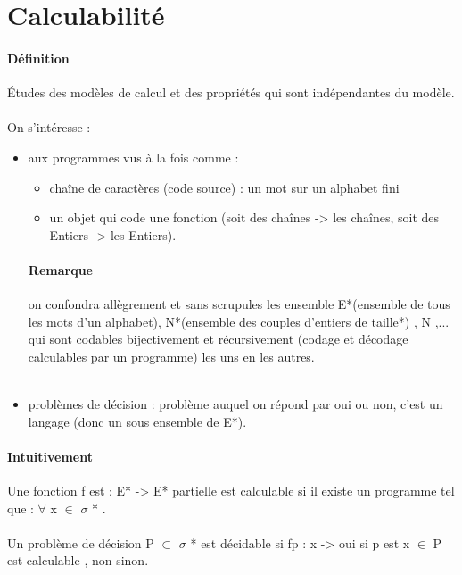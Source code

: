 \documentclass{article}
\begin{document}
\section{Calculabilité}
\paragraph{Définition} Études des modèles de calcul et des propriétés qui sont indépendantes du modèle.\\\\On s'intéresse : 
\begin{itemize}
\item aux programmes vus à la fois comme : 
\begin{itemize}
\item chaîne de caractères (code source) : un mot sur un alphabet fini
\item un objet qui code une fonction (soit des chaînes -> les chaînes, soit des Entiers -> les Entiers).
\end{itemize}
\paragraph{Remarque}on confondra allègrement et sans scrupules les ensemble E*(ensemble de tous les mots d'un alphabet), N*(ensemble des couples d'entiers de taille*) , N ,... qui sont codables bijectivement et récursivement (codage et décodage calculables par un programme)  les uns en les autres.\\\\
\item problèmes de décision : problème auquel on répond par oui ou non, c'est un langage (donc un sous ensemble de E*).
\end{itemize}
\paragraph{Intuitivement}
Une fonction f est : E* -> E* partielle est calculable si il existe un programme tel que : $\forall$ x $\in$ $\sigma$ * .\\\\
Un problème de décision P $\subset$ $\sigma$ * est décidable si fp : x -> oui si p est x $\in$ P est calculable , non sinon.
\end{document}
